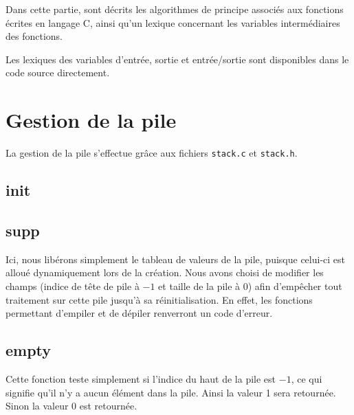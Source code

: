 Dans cette partie, sont décrits les algorithmes de principe associés aux fonctions écrites en langage C, ainsi qu'un lexique concernant les variables intermédiaires des fonctions.

Les lexiques des variables d'entrée, sortie et entrée/sortie sont disponibles dans le code source directement.

\section{Gestion de la pile}
  La gestion de la pile s'effectue grâce aux fichiers \texttt{stack.c} et \texttt{stack.h}.
  
  \subsection{init}
      \begin{algo}[informal] %
      \BEGIN
        \ENDIF
      \END
    \end{algo}

    \begin{algo}[informal] %
      \VAR
      \ENDVAR
    \end{algo}

  \subsection{supp}
    Ici, nous libérons simplement le tableau de valeurs de la pile, puisque celui-ci est alloué dynamiquement lors de la création. Nous avons choisi de modifier les champs (indice de tête de pile à $-1$ et taille de la pile à $0$) afin d'empêcher tout traitement sur cette pile jusqu'à sa réinitialisation. En effet, les fonctions permettant d'empiler et de dépiler renverront un code d'erreur.
  
  \subsection{empty}
    Cette fonction teste simplement si l'indice du haut de la pile est $-1$, ce qui signifie qu'il n'y a aucun élément dans la pile. Ainsi la valeur 1 sera retournée. Sinon la valeur 0 est retournée.
  
